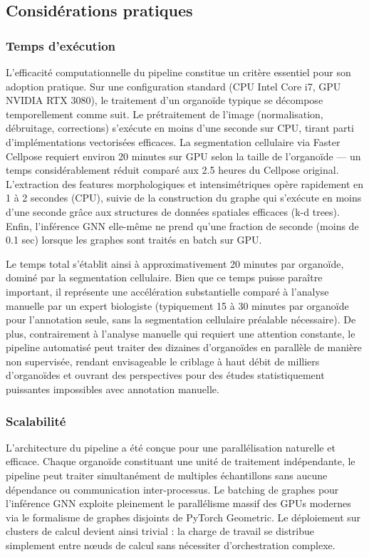 \subsection{Considérations pratiques}

\subsubsection{Temps d'exécution}

L'efficacité computationnelle du pipeline constitue un critère essentiel pour son adoption pratique. Sur une configuration standard (CPU Intel Core i7, GPU NVIDIA RTX 3080), le traitement d'un organoïde typique se décompose temporellement comme suit. Le prétraitement de l'image (normalisation, débruitage, corrections) s'exécute en moins d'une seconde sur CPU, tirant parti d'implémentations vectorisées efficaces. La segmentation cellulaire via Faster Cellpose requiert environ 20 minutes sur GPU selon la taille de l'organoïde — un temps considérablement réduit comparé aux 2.5 heures du Cellpose original. L'extraction des features morphologiques et intensimétriques opère rapidement en 1 à 2 secondes (CPU), suivie de la construction du graphe qui s'exécute en moins d'une seconde grâce aux structures de données spatiales efficaces (k-d trees). Enfin, l'inférence GNN elle-même ne prend qu'une fraction de seconde (moins de 0.1 sec) lorsque les graphes sont traités en batch sur GPU.

Le temps total s'établit ainsi à approximativement 20 minutes par organoïde, dominé par la segmentation cellulaire. Bien que ce temps puisse paraître important, il représente une accélération substantielle comparé à l'analyse manuelle par un expert biologiste (typiquement 15 à 30 minutes par organoïde pour l'annotation seule, sans la segmentation cellulaire préalable nécessaire). De plus, contrairement à l'analyse manuelle qui requiert une attention constante, le pipeline automatisé peut traiter des dizaines d'organoïdes en parallèle de manière non supervisée, rendant envisageable le criblage à haut débit de milliers d'organoïdes et ouvrant des perspectives pour des études statistiquement puissantes impossibles avec annotation manuelle.

\subsubsection{Scalabilité}

L'architecture du pipeline a été conçue pour une parallélisation naturelle et efficace. Chaque organoïde constituant une unité de traitement indépendante, le pipeline peut traiter simultanément de multiples échantillons sans aucune dépendance ou communication inter-processus. Le batching de graphes pour l'inférence GNN exploite pleinement le parallélisme massif des GPUs modernes via le formalisme de graphes disjoints de PyTorch Geometric. Le déploiement sur clusters de calcul devient ainsi trivial : la charge de travail se distribue simplement entre nœuds de calcul sans nécessiter d'orchestration complexe.

